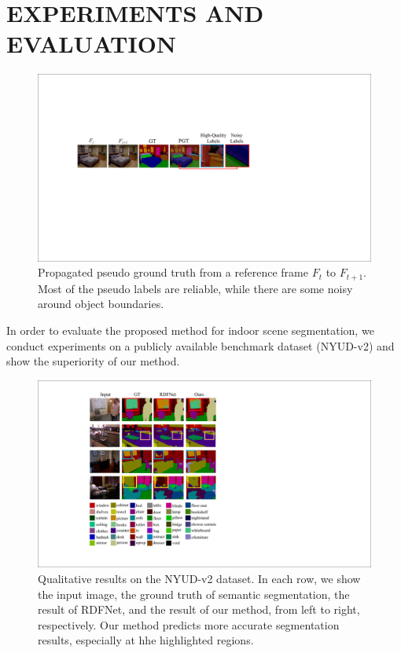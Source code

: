 \section{EXPERIMENTS AND EVALUATION}
\label{sec:exper}

\begin{figure}[t]
	\centering
	\includegraphics[width=\columnwidth]{figure/PGT.pdf}
	\caption{Propagated pseudo ground truth from a reference frame $F_t$ to $F_{t+1}$. Most of the pseudo labels are reliable, while there are some noisy around object boundaries.}
	\label{fig:PGT}
\end{figure}


In order to evaluate the proposed method for indoor scene segmentation, we conduct experiments on a publicly available benchmark dataset (NYUD-v2) and show the superiority of our method.

\begin{figure}[!th]
	\centering
	\includegraphics[width=\columnwidth]{figure/Result.pdf}
	\caption{Qualitative results on the NYUD-v2 dataset. In each row, we show the input image, the ground truth of semantic segmentation, the result of RDFNet, and the result of our method, from left to right, respectively. Our method predicts more accurate segmentation results, especially at hhe highlighted regions.}
	\label{fig:VisResult}
	\vspace*{-0.3cm}
\end{figure}

